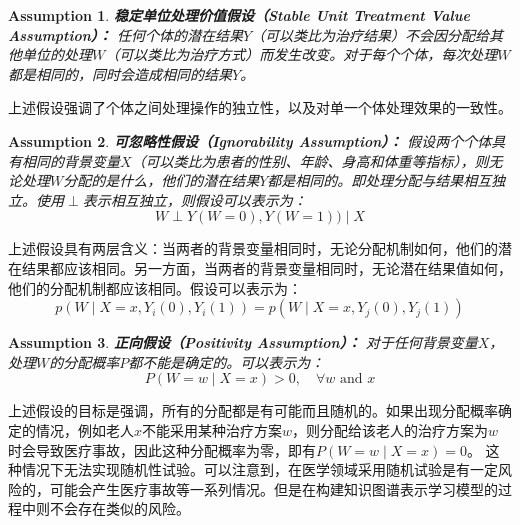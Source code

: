 \documentclass[algorithmlist, AutoFakeBold, AutoFakeSlant, figurelist, tablelist, nomlist, engineering]{seuthesix}
\begin{document}
\newtheorem{assumption}{Assumption}[section]
\begin{assumption}
  \textbf{稳定单位处理价值假设（Stable Unit Treatment Value Assumption）：}
  任何个体的潜在结果$Y$（可以类比为治疗结果）不会因分配给其他单位的处理$W$（可以类比为治疗方式）而发生改变。对于每个个体，每次处理$W$都是相同的，同时会造成相同的结果$Y$。
  \label{1_Assumption}
\end{assumption}
上述假设强调了个体之间处理操作的独立性，以及对单一个体处理效果的一致性。

\begin{assumption}
  \textbf{可忽略性假设（Ignorability Assumption）：}
  假设两个个体具有相同的背景变量$X$（可以类比为患者的性别、年龄、身高和体重等指标），则无论处理$W$分配的是什么，他们的潜在结果$Y$都是相同的。即处理分配与结果相互独立。使用$\perp$表示相互独立，则假设可以表示为：
  \begin{equation}
    W \perp Y(W=0), Y(W=1)) \mid X
  \end{equation}
  \label{2_Assumption}
\end{assumption}
上述假设具有两层含义：当两者的背景变量相同时，无论分配机制如何，他们的潜在结果都应该相同。另一方面，当两者的背景变量相同时，无论潜在结果值如何，他们的分配机制都应该相同。假设可以表示为：
\begin{equation}
  p\left(W \mid X=x, Y_i(0), Y_i(1)\right)=p\left(W \mid X=x, Y_j(0), Y_j(1)\right)
\end{equation}

\begin{assumption}
  \textbf{正向假设（Positivity Assumption）：}
  对于任何背景变量$X$，处理$W$的分配概率$P$都不能是确定的。可以表示为：
  \begin{equation}
    P(W=w \mid X=x)>0, \quad \forall w \text { and } x
  \end{equation}
  \label{3_Assumption}
\end{assumption}
上述假设的目标是强调，所有的分配都是有可能而且随机的。如果出现分配概率确定的情况，例如老人$x$不能采用某种治疗方案$w$，则分配给该老人的治疗方案为$w$时会导致医疗事故，因此这种分配概率为零，即有$P(W=w \mid X=x) = 0$。
这种情况下无法实现随机性试验。可以注意到，在医学领域采用随机试验是有一定风险的，可能会产生医疗事故等一系列情况。但是在构建知识图谱表示学习模型的过程中则不会存在类似的风险。
\end{document}
